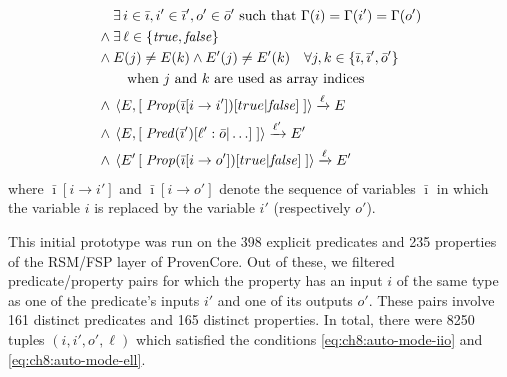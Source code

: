 \documentclass[11pt]{article}
\begin{document}
\begin{align}
  \label{eq:ch8:auto-mode-iio}
                                   & \exists\, i \in \bar{\imath}, i' \in \bar{\imath}', o' \in \bar{o}' \text{ such that } \Gamma(i) = \Gamma(i') = \Gamma(o')            \\
  \label{eq:ch8:auto-mode-ell}
  \vphantom{a} \wedge \vphantom{b} & \exists\, \ell \in \{\mathit{true}, \mathit{false}\}                                                                                  \\
  \vphantom{a} \wedge \vphantom{b} & E(j) \neq E(k) \wedge E'(j) \neq E'(k) \quad \forall j,k \in \{\bar{\imath},\bar{\imath}',\bar{o}'\}                                  \\
                                   & \quad \text{when $j$ and $k$ are used as array indices}                                                                               \\
  \vphantom{a} \wedge \vphantom{b} & \left\langle E, \left[\;\mathit{Prop}(\bar{\imath}[i \rightarrow i'])[true|\mathit{false}]\;\right]\right\rangle \xrightarrow{\ell} E \\
  \vphantom{a} \wedge \vphantom{b} & \left\langle E, \left[\;\mathit{Pred}(\bar{\imath}')[\ell': \bar{o}|\ldots]\;\right]\right\rangle \xrightarrow{\ell'} E'              \\
  \label{eq:ch8:auto-mode-last}
\vphantom{a} \wedge \vphantom{b} & \left\langle E' \left[\;\mathit{Prop}(\bar{\imath}[i \rightarrow o'])[true|\mathit{false}]\;\right]\right\rangle \xrightarrow{\ell} E'
\end{align}
where $\bar{\imath}[i  \rightarrow i']$ and $\bar{\imath}[i  \rightarrow o']$
denote the sequence of variables $\bar{\imath}$  in which the variable $i$ is
replaced by the variable $i'$ (respectively $o'$).


This initial  prototype was run on  the 398 explicit predicates and  235 properties of
the RSM/FSP layer of ProvenCore. Out of these, we filtered predicate/property
pairs for which the property has an input  $i$ of the same type as one of the
predicate's inputs $i'$ and one of  its outputs $o'$. These pairs involve 161
distinct predicates  and 165 distinct  properties. In total, there  were 8250
tuples    $(i,   i',    o',   \ell)$    which   satisfied    the   conditions
\ref{eq:ch8:auto-mode-iio} and \ref{eq:ch8:auto-mode-ell}.
\end{document}
